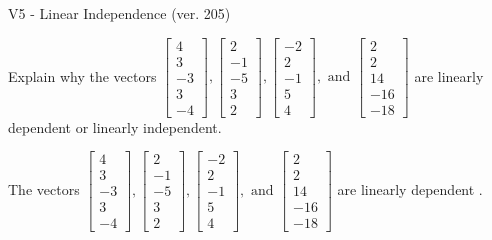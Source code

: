 \begin{exercise}
  \begin{exerciseTitle}V5 - Linear Independence (ver. 205)\end{exerciseTitle}
  \begin{exerciseStatement}
    Explain why the vectors \(\left[\begin{array}{r}
4 \\
3 \\
-3 \\
3 \\
-4
\end{array}\right] , \left[\begin{array}{r}
2 \\
-1 \\
-5 \\
3 \\
2
\end{array}\right] , \left[\begin{array}{r}
-2 \\
2 \\
-1 \\
5 \\
4
\end{array}\right] , \text{ and } \left[\begin{array}{r}
2 \\
2 \\
14 \\
-16 \\
-18
\end{array}\right]\) are linearly dependent or linearly independent.	


  \end{exerciseStatement}
  \begin{exerciseAnswer}
   The vectors \(\left[\begin{array}{r}
4 \\
3 \\
-3 \\
3 \\
-4
\end{array}\right] , \left[\begin{array}{r}
2 \\
-1 \\
-5 \\
3 \\
2
\end{array}\right] , \left[\begin{array}{r}
-2 \\
2 \\
-1 \\
5 \\
4
\end{array}\right] , \text{ and } \left[\begin{array}{r}
2 \\
2 \\
14 \\
-16 \\
-18
\end{array}\right]\) are 
  	 linearly dependent  .
  


  \end{exerciseAnswer}
\end{exercise}